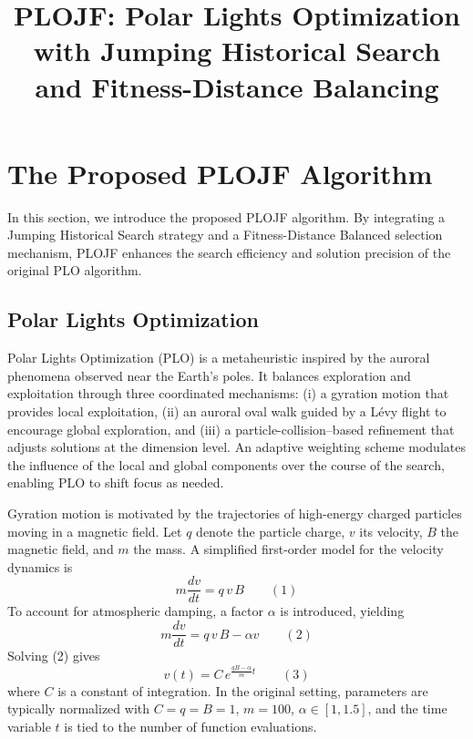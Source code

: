 \documentclass[3p]{elsarticle}
\begin{document}
\begin{frontmatter}

\title{\textbf{PLOJF: Polar Lights Optimization with Jumping Historical Search and Fitness-Distance Balancing}}

\begin{abstract}

\end{abstract}

\begin{keyword}

\end{keyword}

\end{frontmatter}

\section{The Proposed PLOJF Algorithm}
In this section, we introduce the proposed PLOJF algorithm. By integrating a Jumping Historical Search strategy and a Fitness-Distance Balanced selection mechanism, PLOJF enhances the search efficiency and solution precision of the original PLO algorithm.

\subsection{Polar Lights Optimization}
Polar Lights Optimization (PLO) is a metaheuristic inspired by the auroral phenomena observed near the Earth's poles. It balances exploration and exploitation through three coordinated mechanisms: (i) a gyration motion that provides local exploitation, (ii) an auroral oval walk guided by a Lévy flight to encourage global exploration, and (iii) a particle-collision–based refinement that adjusts solutions at the dimension level. An adaptive weighting scheme modulates the influence of the local and global components over the course of the search, enabling PLO to shift focus as needed.

Gyration motion is motivated by the trajectories of high-energy charged particles moving in a magnetic field. Let \(q\) denote the particle charge, \(v\) its velocity, \(B\) the magnetic field, and \(m\) the mass. A simplified first-order model for the velocity dynamics is
\[ m\frac{dv}{dt} = q\,v\,B \qquad(1) \]
To account for atmospheric damping, a factor \(\alpha\) is introduced, yielding
\[ m\frac{dv}{dt} = q\,v\,B - \alpha v \qquad(2) \]
Solving (2) gives
\[ v(t) = C\,e^{\frac{qB-\alpha}{m}t} \qquad(3) \]
where \(C\) is a constant of integration. In the original setting, parameters are typically normalized with \(C=q=B=1\), \(m=100\), \(\alpha\in[1,1.5]\), and the time variable \(t\) is tied to the number of function evaluations.
\end{document}
